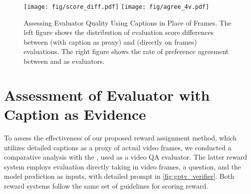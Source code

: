 \begin{figure}[ht]
\centering
\texttt{[image: fig/score\_diff.pdf]} 
\texttt{[image: fig/agree\_4v.pdf]} 
\caption{Assessing Evaluator Quality Using Captions in Place of Frames. The left figure shows the distribution of evaluation score differences between \chatgpt (with caption as proxy) and \gptv (directly on frames) evaluations. The right figure shows the rate of preference agreement between \chatgpt and \gptv as evaluators.}

\label{fig:evaluator_assessment}
\end{figure}

\section{Assessment of Evaluator with \gptv Caption as Evidence}
\label{sec:evaluator_assessment}

To assess the effectiveness of our proposed reward assignment method, which utilizes detailed captions as a proxy of actual video frames, we conducted a comparative analysis with the \gptv, used as a video QA evaluator. The latter reward system employs \gptv evaluation directly taking in video frames, a question, and the model prediction as inputs, with detailed prompt in \cref{fig:gptv_verifier}. Both reward systems follow the same set of guidelines for scoring reward. 

